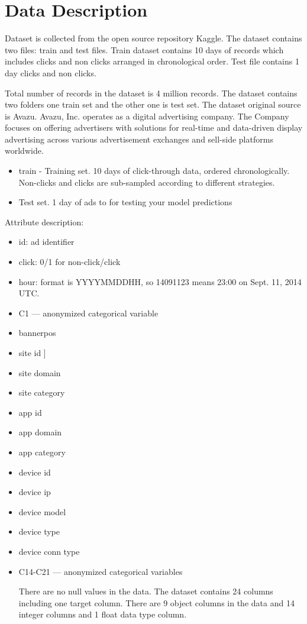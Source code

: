 \documentclass[conference]{IEEEtran}
\begin{document}
\newpage
\section{Data Description}\label{AA}
Dataset is collected from the open source repository Kaggle. The dataset contains two files: train and test files. Train dataset contains 10 days of records which includes clicks and non clicks arranged in chronological order. Test file contains 1 day clicks and non clicks.  

Total number of records in the dataset is 4 million records. The dataset contains two folders one train set and the other one is test set. The dataset original source is Avazu. Avazu, Inc. operates as a digital advertising company. The Company focuses on offering advertisers with solutions for real-time and data-driven display advertising across various advertisement exchanges and sell-side platforms worldwide.


\begin{itemize}
    \item train - Training set. 10 days of click-through data, ordered chronologically. Non-clicks and clicks are sub-sampled according to different strategies.
    \item Test set. 1 day of ads to for testing your model predictions
\end{itemize}

Attribute description:
\begin{itemize}
    \item id: ad identifier
    \item click: 0/1 for non-click/click
    \item hour: format is YYYYMMDDHH, so 14091123 means 23:00 on Sept. 11, 2014 UTC.
    \item C1 — anonymized categorical variable
    \item bannerpos
    \item site id
    ]\item site domain
    \item site category
    \item app id
    \item app domain
    \item app category
    \item device id
    \item device ip
    \item device model
    \item device type
    \item device conn type
    \item C14-C21 — anonymized categorical variables

There are no null values in the data. The dataset contains 24 columns including one target column. There are 9 object columns in the data and 14 integer columns and 1 float data type column.
\end{itemize}
\newpage
\end{document}
